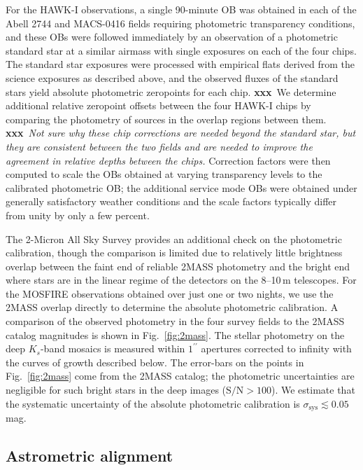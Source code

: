\documentclass[iop, numberedappendix]{emulateapj}
\gdef\arcsec{^{\prime\prime}}
\gdef\xxx{\textbf{xxx}}
\begin{document}
For the HAWK-I observations, a single 90-minute OB was obtained in each of the Abell 2744 and MACS-0416 fields requiring photometric transparency conditions, and these OBs were followed immediately by an observation of a photometric standard star at a similar airmass with single exposures on each of the four chips.  The standard star exposures were processed with empirical flats derived from the science exposures as described above, and the observed fluxes of the standard stars yield absolute photometric zeropoints for each chip.  \xxx\ We determine additional relative zeropoint offsets between the four HAWK-I chips by comparing the photometry of sources in the overlap regions between them.  \xxx\ \textit{Not sure why these chip corrections are needed beyond the standard star, but they are consistent between the two fields and are needed to improve the agreement in relative depths between the chips.} Correction factors were then computed to scale the OBs obtained at varying transparency levels to the calibrated photometric OB; the additional service mode OBs were obtained under generally satisfactory weather conditions and the scale factors typically differ from unity by only a few percent.  

The 2-Micron All Sky Survey \citep[2MASS;][]{2mass} provides an additional check on the photometric calibration, though the comparison is limited due to relatively little brightness overlap between the faint end of reliable 2MASS photometry and the bright end where stars are in the linear regime of the detectors on the 8--10\,m telescopes.  For the MOSFIRE observations obtained over just one or two nights, we use the 2MASS overlap directly to determine the absolute photometric calibration.  A comparison of the observed photometry in the four survey fields to the 2MASS catalog magnitudes is shown in Fig.~\ref{fig:2mass}.  The stellar photometry on the deep $K_s$-band mosaics is measured within $1\arcsec$ apertures corrected to infinity with the curves of growth described below.  The error-bars on the points in Fig.~\ref{fig:2mass} come from the 2MASS catalog; the photometric uncertainties are negligible for such bright stars in the deep images ($\mathrm{S/N}>100$). We estimate that the systematic uncertainty of the absolute photometric calibration is $\sigma_\mathrm{sys}\lesssim 0.05$ mag.

\subsection{Astrometric alignment}
\label{s:astrometry}
\end{document}
